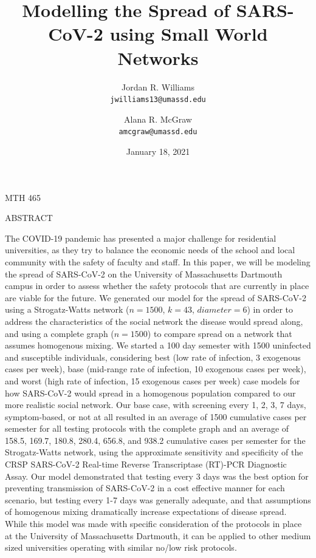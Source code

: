 \documentclass[fullpage]{extarticle}
\title{Modelling the Spread of SARS-CoV-2 using Small World Networks}
\author{
	Jordan R. Williams\\
	\texttt{jwilliams13@umassd.edu}
	\and
	Alana R. McGraw\\
	\texttt{amcgraw@umassd.edu}
}
\date{January 18, 2021}
\begin{document}
\maketitle
\begin{center}
MTH 465\\
\end{center}

\begin{large}
\begin{center}\bigbreak\bigbreak\bigbreak
ABSTRACT
\end{center}
\end{large}

\begin{large}
\begin{flushleft}
The COVID-19 pandemic has presented a major challenge for residential universities, as they try to balance the economic needs of the school and local community with the safety of faculty and staff. In this paper, we will be modeling the spread of SARS-CoV-2 on the University of Massachusetts Dartmouth campus in order to assess whether the safety protocols that are currently in place are viable for the future. We generated our model for the spread of SARS-CoV-2 using a Strogatz-Watts network ($n=1500$, $k=43$, $diameter=6$) in order to address the characteristics of the social network the disease would spread along, and using a complete graph ($n=1500$) to compare spread on a network that assumes homogenous mixing. We started a 100 day semester with 1500 uninfected and susceptible individuals, considering best (low rate of infection, 3 exogenous cases per week), base (mid-range rate of infection, 10 exogenous cases per week), and worst (high rate of infection, 15 exogenous cases per week) case models for how SARS-CoV-2 would spread in a homogenous population compared to our more realistic social network. Our base case, with screening every 1, 2, 3, 7 days, symptom-based, or not at all resulted in an average of 1500 cumulative cases per semester for all testing protocols with the complete graph and an average of 158.5, 169.7, 180.8, 280.4, 656.8, and 938.2 cumulative cases per semester for the Strogatz-Watts network, using the approximate sensitivity and specificity of the CRSP SARS-CoV-2 Real-time Reverse Transcriptase (RT)-PCR Diagnostic Assay. Our model demonstrated that testing every 3 days was the best option for preventing transmission of SARS-CoV-2 in a cost effective manner for each scenario, but testing every 1-7 days was generally adequate, and that assumptions of homogenous mixing dramatically increase expectations of disease spread. While this model was made with specific consideration of the protocols in place at the University of Massachusetts Dartmouth, it can be applied to other medium sized universities operating with similar no/low risk protocols.
\end{flushleft}
\end{large}
\end{document}
